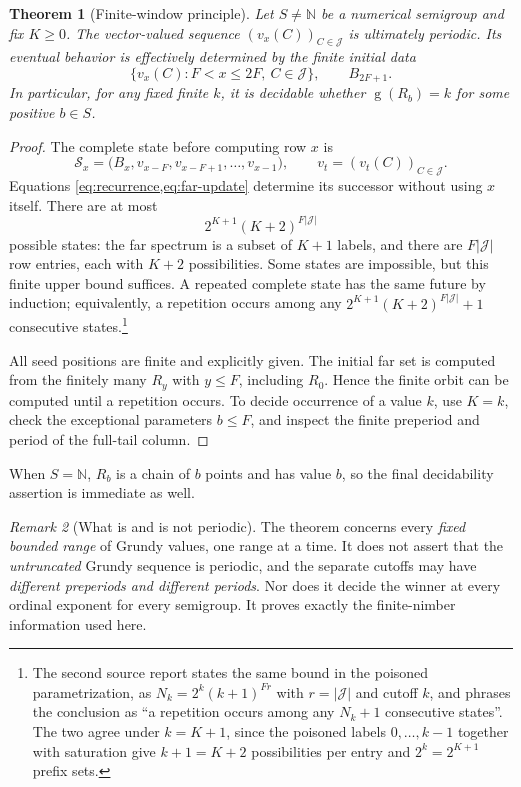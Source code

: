 \documentclass[11pt,letterpaper]{article}
\numberwithin{equation}{section}
\newtheorem{theorem}{Theorem}[section]
\theoremstyle{definition}
\theoremstyle{remark}
\newtheorem{remark}[theorem]{Remark}
\newcommand{\N}{\mathbb N}
\newcommand{\sg}{\operatorname{g}}
\newcommand{\J}{\mathcal J}
\begin{document}
\begin{theorem}[Finite-window principle]\label{thm:window}
Let $S\ne\N$ be a numerical semigroup and fix $K\geq0$.
The vector-valued sequence $(v_x(C))_{C\in\J}$ is ultimately
periodic. Its eventual behavior is effectively determined by the
finite initial data
\[
 \{v_x(C):F<x\leq2F,\ C\in\J\},\qquad B_{2F+1}.
\]
In particular, for any fixed finite $k$, it is decidable whether
$\sg(R_b)=k$ for some positive $b\in S$.
\end{theorem}
\begin{proof}
The complete state before computing row $x$ is
\begin{equation}\label{eq:complete-state}
 \mathscr S_x=
 \bigl(B_x,v_{x-F},v_{x-F+1},\ldots,v_{x-1}\bigr),
 \qquad v_t=(v_t(C))_{C\in\J}.
\end{equation}
Equations \cref{eq:recurrence,eq:far-update} determine its successor
without using $x$ itself. There are at most
\begin{equation}\label{eq:state-bound}
 2^{K+1}(K+2)^{F|\J|}
\end{equation}
possible states: the far spectrum is a subset of $K+1$ labels, and
there are $F|\J|$ row entries, each with $K+2$ possibilities.
Some states are impossible, but this finite upper bound suffices.
A repeated complete state has the same future by induction; equivalently,
a repetition occurs among any $2^{K+1}(K+2)^{F|\J|}+1$ consecutive
states.\footnote{The second source report states the same bound in the
poisoned parametrization, as $N_k=2^{k}(k+1)^{Fr}$ with $r=|\J|$ and
cutoff $k$, and phrases the conclusion as ``a repetition occurs among any
$N_k+1$ consecutive states''. The two agree under $k=K+1$, since the
poisoned labels $0,\ldots,k-1$ together with saturation give $k+1=K+2$
possibilities per entry and $2^k=2^{K+1}$ prefix sets.}

All seed positions are finite and explicitly given. The initial far
set is computed from the finitely many $R_y$ with $y\leq F$,
including $R_0$. Hence the finite orbit can be computed until a
repetition occurs. To decide occurrence of a value $k$, use $K=k$,
check the exceptional parameters $b\leq F$, and inspect the finite
preperiod and period of the full-tail column.
\end{proof}

When $S=\N$, $R_b$ is a chain of $b$ points and has value $b$,
so the final decidability assertion is immediate as well.

\begin{remark}[What is and is not periodic]\label{rem:bounded}
The theorem concerns every \emph{fixed bounded range} of Grundy values,
one range at a time. It does not assert that the \emph{untruncated}
Grundy sequence is periodic, and the separate cutoffs may have
\emph{different preperiods and different periods}. Nor does it decide the
winner at every ordinal exponent for every semigroup. It proves exactly
the finite-nimber information used here.
\end{remark}
\end{document}
